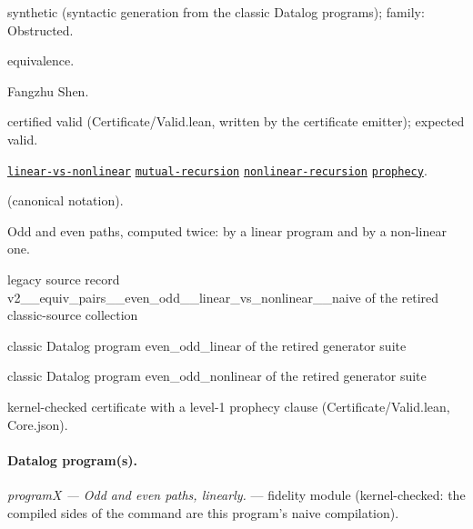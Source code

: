 \documentclass[10pt]{article}
\begin{document}
\begin{description}[leftmargin=2.6cm,style=nextline,itemsep=1pt]

\item[Category] synthetic (syntactic generation from the classic Datalog programs); family: Obstructed.

\item[Kind] equivalence.

\item[Contributors] Fangzhu Shen.

\item[Status] certified valid (Certificate/Valid.lean, written by the certificate emitter); expected valid.

\item[Tags] \hyperref[tag:linear-vs-nonlinear]{\texttt{linear-vs-nonlinear}} \hyperref[tag:mutual-recursion]{\texttt{mutual-recursion}} \hyperref[tag:nonlinear-recursion]{\texttt{nonlinear-recursion}} \hyperref[tag:prophecy]{\texttt{prophecy}}.

\item[Input]  (canonical notation).

\item[Summary] Odd and even paths, computed twice: by a linear program and by a non-linear one.

\item[Sources] {\raggedright legacy source record v2\_\_equiv\_pairs\_\_even\_odd\_\_linear\_vs\_nonlinear\_\_naive of the retired classic-source collection \par classic Datalog program even\_odd\_linear of the retired generator suite \par classic Datalog program even\_odd\_nonlinear of the retired generator suite\par}

\item[Prophecy] kernel-checked certificate with a level-1 prophecy clause (Certificate/Valid.lean, Core.json).

\end{description}

\paragraph{Datalog program(s).}

{\raggedright\textit{programX --- Odd and even paths, linearly.} --- fidelity module (kernel-checked: the compiled sides of the command are this program's naive compilation).\par}
\end{document}

